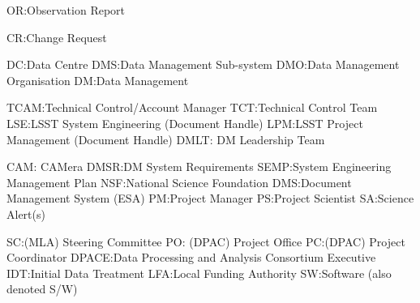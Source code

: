 
OR:Observation Report

CR:Change Request

DC:Data Centre
DMS:Data Management Sub-system
DMO:Data Management Organisation
DM:Data Management

TCAM:Technical Control/Account Manager
TCT:Technical Control Team
LSE:LSST System Engineering (Document Handle)
LPM:LSST Project Management (Document Handle)
DMLT: DM Leadership Team

CAM: CAMera
DMSR:DM System Requirements
SEMP:System Engineering Management Plan
NSF:National Science Foundation
DMS:Document Management System (ESA)
PM:Project Manager
PS:Project Scientist
SA:Science Alert(s)

SC:(MLA) Steering Committee
PO: (DPAC) Project Office
PC:(DPAC) Project Coordinator
DPACE:Data Processing and Analysis Consortium Executive
IDT:Initial Data Treatment
LFA:Local Funding Authority
SW:Software (also denoted S/W)
